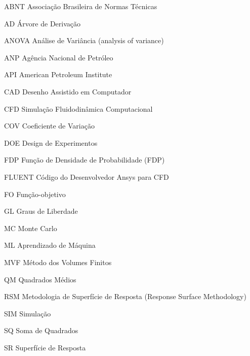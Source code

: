 \documentclass[
	12pt,				%
	openright,			%
	oneside,			%
	a4paper,			%
	english,			%
	french,				%
	spanish,			%
	brazil				%
	]{abntex2}
\begin{document}
\listoffigures*
\cleardoublepage

\listoftables*
\cleardoublepage

\begin{siglas}
\item[ABNT] Associação Brasileira de Normas Técnicas
\item[AD] Árvore de Derivação
\item[ANOVA] Análise de Variância (analysis of variance)
\item[ANP] Agência Nacional de Petróleo
\item[API] American Petroleum Institute
\item[CAD] Desenho Assistido em Computador
\item[CFD] Simulação Fluidodinâmica Computacional
\item[COV] Coeficiente de Variação
\item[DOE] Design de Experimentos
\item[FDP] Função de Densidade de Probabilidade (FDP)
\item[FLUENT] Código do Desenvolvedor Ansys para CFD
\item[FO] Função-objetivo
\item[GL] Graus de Liberdade 
\item [MC] Monte Carlo
\item[ML] Aprendizado de Máquina
\item[MVF] Método dos Volumes Finitos
\item[QM] Quadrados Médios
\item[RSM] Metodologia de Superfície de Resposta (Response Surface
Methodology)
\item[SIM] Simulação 
\item[SQ] Soma de Quadrados
\item[SR] Superfície de Resposta



\end{siglas}


\tableofcontents*
\cleardoublepage


 \setcounter{page}{1}
\textual 









\end{document}
